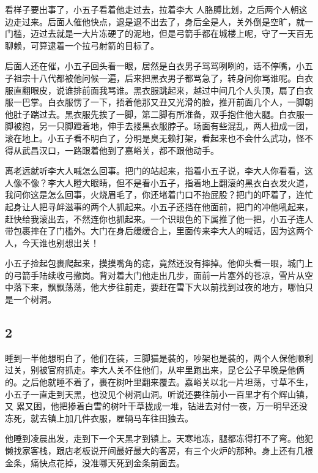 看样子要出事了，小五子看着他走过去，拉着李大
人胳膊比划，之后两个人朝这边走过来。后面人催他快点，退是退不出去了，身后全是人，关外倒是空旷，就一门槛，迈过去就是一大片冻硬了的泥地，但是弓箭手都在城楼上呢，守了一天百无聊赖，可算逮着一个拉弓射箭的目标了。

后面人还在催，小五子回头看一眼，居然是白衣男子骂骂咧咧的，话不停嘴，小五子祖宗十八代都被他问候一遍，后来把黑衣男子都骂急了，转身问你骂谁呢。白衣服直翻眼皮，说谁排前面我骂谁。黑衣服跳起来，越过中间几个人头顶，扇了白衣服一巴掌。白衣服愣了一下，捂着他那又丑又光滑的脸，推开前面几个人，一脚朝他肚子踹过去。黑衣服先挨了一脚，第二脚有所准备，双手抱住他大腿。白衣服一脚被抱，另一只脚蹬着地，伸手去搂黑衣服脖子。场面有些混乱，两人扭成一团，滚在地上。小五子看不明白了，分明是臭无赖打架，看起来也不会什么武功，怪不得从武昌汉口，一路跟着他到了嘉峪关，都不跟他动手。

离老远就听李大人喊怎么回事。把门的站起来，指着小五子说，李大人你看看，这人像不像？李大人瞪大眼睛，但不是看小五子，指着地上翻滚的黑衣白衣发火道，我问你这是怎么回事，火烧眉毛了，你还堵着门口不抬屁股？把门的吓着了，连忙起身让人把寻衅滋事的两个人抓起来。小五子还挡在他面前，把门的冲他吼起来，赶快给我滚出去，不然连你也抓起来。一个识眼色的下属推了他一把，小五子连人带包裹摔在了门槛外。大门在身后缓缓合上，里面传来李大人的喊话，因为这两个人，今天谁也别想出关！

小五子捡起包裹爬起来，摸摸嘴角的痣，竟然还没有摔掉。他仰头看一眼，城门上的弓箭手陆续收弓撤岗。背对着大门他走出几步，面前一片塞外的苍凉，雪片从空中落下来，飘飘荡荡，他大步往前走，要赶在雪下大以前找到过夜的地方，哪怕只是一个树洞。
\newline

{\centering\subsection{2}}

睡到一半他想明白了，他们在装，三脚猫是装的，吵架也是装的，两个人保他顺利过关，别被官府抓走。李大人关不住他们，从牢里跑出来，昆仑公子早晚是他俩的。之后他就睡不着了，裹在树叶里翻来覆去。嘉峪关以北一片坦荡，寸草不生，小五子一直走到天黑，也没见个树洞山洞。听说还要往前小一百里才有个辉山镇，又
累又困，他把掺着白雪的树叶干草拢成一堆，钻进去对付一夜，万一明早还没冻死，就去镇上加几件衣服，雇辆马车往田独去。

他睡到凌晨出发，走到下一个天黑才到镇上。天寒地冻，腿都冻得打不了弯。他犯懒找家客栈，跟店老板说开间最好最大的客房，有三个火炉的那种。身上还有几根金条，痛快点花掉，没准哪天死到金条前面去。

